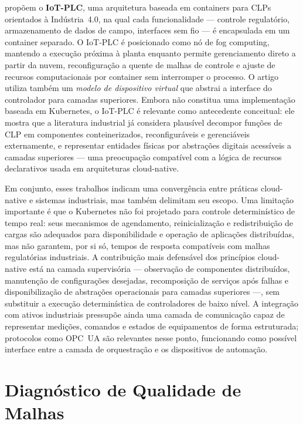 propõem o \textbf{IoT-PLC}, uma arquitetura baseada em containers para CLPs orientados à Indústria~4.0, na qual cada funcionalidade --- controle regulatório, armazenamento de dados de campo, interfaces sem fio --- é encapsulada em um container separado. O IoT-PLC é posicionado como nó de fog computing, mantendo a execução próxima à planta enquanto permite gerenciamento direto a partir da nuvem, reconfiguração a quente de malhas de controle e ajuste de recursos computacionais por container sem interromper o processo. O artigo utiliza também um \textit{modelo de dispositivo virtual} que abstrai a interface do controlador para camadas superiores. Embora não constitua uma implementação baseada em Kubernetes, o IoT-PLC é relevante como antecedente conceitual: ele mostra que a literatura industrial já considera plausível decompor funções de CLP em componentes conteinerizados, reconfiguráveis e gerenciáveis externamente, e representar entidades físicas por abstrações digitais acessíveis a camadas superiores --- uma preocupação compatível com a lógica de recursos declarativos usada em arquiteturas cloud-native.

Em conjunto, esses trabalhos indicam uma convergência entre práticas cloud-native e sistemas industriais, mas também delimitam seu escopo. Uma limitação importante é que o Kubernetes não foi projetado para controle determinístico de tempo real: seus mecanismos de agendamento, reinicialização e redistribuição de cargas são adequados para disponibilidade e operação de aplicações distribuídas, mas não garantem, por si só, tempos de resposta compatíveis com malhas regulatórias industriais. A contribuição mais defensável dos princípios cloud-native está na camada supervisória --- observação de componentes distribuídos, manutenção de configurações desejadas, recomposição de serviços após falhas e disponibilização de abstrações operacionais para camadas superiores ---, sem substituir a execução determinística de controladores de baixo nível. A integração com ativos industriais pressupõe ainda uma camada de comunicação capaz de representar medições, comandos e estados de equipamentos de forma estruturada; protocolos como OPC~UA são relevantes nesse ponto, funcionando como possível interface entre a camada de orquestração e os dispositivos de automação.


\section{Diagnóstico de Qualidade de Malhas}
\label{sec:diagnostico}

